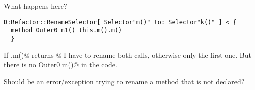 \begin{frame}[fragile]
What happens here?
\begin{NiceCode}{59ex}{0.8}
\begin{lstlisting}
D:Refactor::RenameSelector[ Selector"m()" to: Selector"k()" ] < {
  method Outer0 m1() this.m().m()
  }
\end{lstlisting}
\end{NiceCode}

If \Q@this.m()@ returns @ I have to rename both calls,
otherwise only the first one.
But there is no \Q@method Outer0 m()@
in the code.

Should be an error/exception trying to rename
a method that is not declared?

\end{frame}



